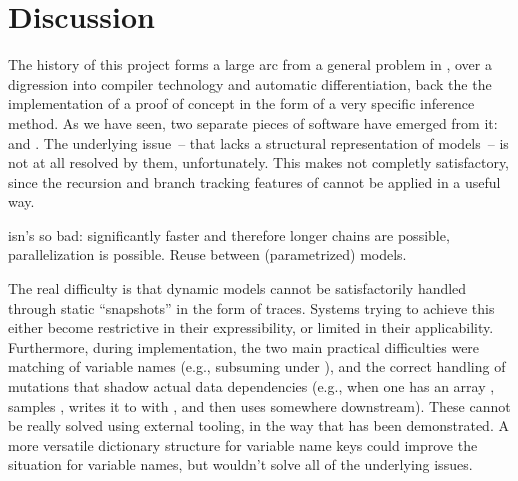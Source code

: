 \chapter{Discussion}
\label{cha:discussion}

The history of this project forms a large arc from a general problem in \turingjl{}, over a
digression into compiler technology and automatic differentiation, back the the implementation of a
proof of concept in the form of a very specific inference method.  As we have seen, two separate
pieces of software have emerged from it: \irtrackerjl{} and \autogibbsjl{}.  The underlying issue~--
that \turingjl{} lacks a structural representation of models~-- is not at all resolved by them,
unfortunately.  This makes \autogibbsjl{} not completly satisfactory, since the recursion and branch
tracking features of \irtrackerjl{} cannot be applied in a useful way.

\autogibbsjl{} isn's so bad: significantly faster and therefore longer chains are possible,
parallelization is possible.  Reuse between (parametrized) models.

The real difficulty is that dynamic models cannot be satisfactorily handled through static
\enquote{snapshots} in the form of traces.  Systems trying to achieve this either become restrictive
in their expressibility, or limited in their applicability. Furthermore, during implementation, the two main practical difficulties were matching of
variable names (e.g., subsuming  under ), and the correct handling
of mutations that shadow actual data dependencies (e.g., when one has an array , samples
, writes it to  with , and then uses 
somewhere downstream).  These cannot be really solved using external tooling, in the way that has
been demonstrated.  A more versatile dictionary structure for variable name keys could improve the
situation for variable names, but wouldn't solve all of the underlying issues.

